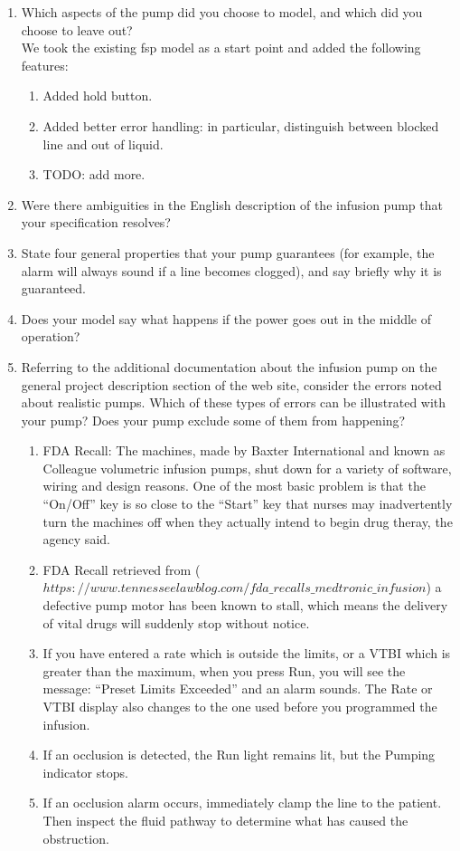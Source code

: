 \documentclass{article}
\begin{document}
\begin{enumerate}
\item Which aspects of the pump did you choose to model, and which did you choose to leave out? \\
  We took the existing fsp model as a start point and added the following features: \\
  \begin{enumerate}
  \item Added hold button.
  \item Added better error handling: in particular, distinguish between blocked line and out of liquid.
    \item TODO: add more.
  \end{enumerate}
    \item Were there ambiguities in the English description of the infusion pump that your specification resolves?
    \item State four general properties that your pump guarantees (for example, the alarm will always sound if a line becomes clogged), and say briefly why it is guaranteed.
    \item Does your model say what happens if the power goes out in the middle of operation?
    \item Referring to the additional documentation about the infusion pump on the general project description section of the web site, consider the errors noted about realistic pumps. Which of these types of errors can be illustrated with your pump? Does your pump exclude some of them from happening? \\
      \begin{enumerate}
      \item FDA Recall: The machines, made by Baxter International and known as Colleague volumetric infusion pumps, shut down for a variety of software, wiring and design reasons. One of the most basic problem is that the ``On/Off'' key is so close to the ``Start'' key that nurses may inadvertently turn the machines off when they actually intend to begin drug theray, the agency said.
      \item FDA Recall retrieved from ($https://www.tennesseelawblog.com/fda\_recalls\_medtronic\_infusion$) a defective pump motor has been known to stall, which means the delivery of vital drugs will suddenly stop without notice.
      \item If you have entered a rate which is outside the limits, or a VTBI which is greater than the maximum, when you press Run, you will see the message: ``Preset Limits Exceeded'' and an alarm sounds. The Rate or VTBI display also changes to the one used before you programmed the infusion.
      \item If an occlusion is detected, the Run light remains lit, but the Pumping indicator stops.
      \item If an occlusion alarm occurs, immediately clamp the line to the patient. Then inspect the fluid pathway to determine what has caused the obstruction. 
      \end{enumerate}

\end{enumerate}
\end{document}
